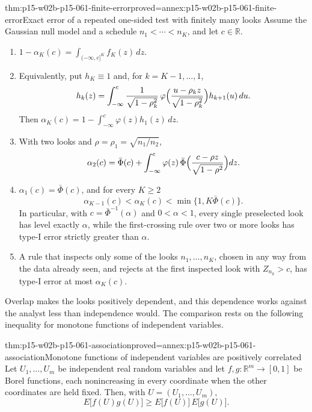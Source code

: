 \begin{hbtheorem}{thm:p15-w02b-p15-061-finite-error}{proved=annex:p15-w02b-p15-061-finite-error}{Exact error of a repeated one-sided test with finitely many looks}
Assume the Gaussian null model and a schedule
\(n_1<\cdots<n_K\), and let \(c\in\mathbb R\).
\begin{enumerate}
\item \(\displaystyle 1-\alpha_K(c)=\int_{(-\infty,c]^K}f_K(z)\,dz.\)
\item Equivalently, put \(h_K\equiv1\) and, for \(k=K-1,\ldots,1\),
\[
 h_k(z)=\int_{-\infty}^{c}\frac1{\sqrt{1-\rho_k^2}}\,
 \varphi\Bigl(\frac{u-\rho_kz}{\sqrt{1-\rho_k^2}}\Bigr)h_{k+1}(u)\,du.
\]
Then \(\alpha_K(c)=1-\int_{-\infty}^{c}\varphi(z)h_1(z)\,dz\).
\item With two looks and \(\rho=\rho_1=\sqrt{n_1/n_2}\),
\[
 \alpha_2(c)=\bar\Phi(c)+\int_{-\infty}^{c}\varphi(z)\,
 \bar\Phi\Bigl(\frac{c-\rho z}{\sqrt{1-\rho^2}}\Bigr)dz .
\]
\item \(\alpha_1(c)=\bar\Phi(c)\), and for every \(K\geq2\)
\[
 \alpha_{K-1}(c)<\alpha_K(c)<\min\{1,K\bar\Phi(c)\}.
\]
In particular, with \(c=\bar\Phi^{-1}(\alpha)\) and \(0<\alpha<1\),
every single preselected look has level exactly \(\alpha\), while the
first-crossing rule over two or more looks has type-I error strictly
greater than \(\alpha\).
\item A rule that inspects only some of the looks \(n_1,\ldots,n_K\),
chosen in any way from the data already seen, and rejects at the first
inspected look with \(Z_{n_k}>c\), has type-I error at most
\(\alpha_K(c)\).
\end{enumerate}
\end{hbtheorem}

Overlap makes the looks positively dependent, and this dependence works
against the analyst less than independence would. The comparison rests on
the following inequality for monotone functions of independent variables.

\begin{hblemma}{thm:p15-w02b-p15-061-association}{proved=annex:p15-w02b-p15-061-association}{Monotone functions of independent variables are positively correlated}
Let \(U_1,\ldots,U_m\) be independent real random variables and let
\(f,g\colon\mathbb R^m\to[0,1]\) be Borel functions, each nonincreasing in
every coordinate when the other coordinates are held fixed. Then, with
\(U=(U_1,\ldots,U_m)\),
\[
 E\bigl[f(U)g(U)\bigr]\geq E\bigl[f(U)\bigr]\,E\bigl[g(U)\bigr].
\]
\end{hblemma}

